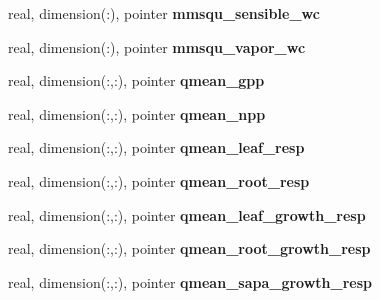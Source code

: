 \begin{DoxyCompactItemize}
\item 
\hypertarget{structed__state__vars_1_1patchtype_a44fbdd74f353ead65b3e826ad82fc1e7}{
real, dimension(:), pointer {\bfseries mmsqu\_\-sensible\_\-wc}}
\label{structed__state__vars_1_1patchtype_a44fbdd74f353ead65b3e826ad82fc1e7}

\item 
\hypertarget{structed__state__vars_1_1patchtype_a7b4691bbc3e40181dce7f83e270026c5}{
real, dimension(:), pointer {\bfseries mmsqu\_\-vapor\_\-wc}}
\label{structed__state__vars_1_1patchtype_a7b4691bbc3e40181dce7f83e270026c5}

\item 
\hypertarget{structed__state__vars_1_1patchtype_a8510cec7ca4e820044e79ff1ed068f52}{
real, dimension(:,:), pointer {\bfseries qmean\_\-gpp}}
\label{structed__state__vars_1_1patchtype_a8510cec7ca4e820044e79ff1ed068f52}

\item 
\hypertarget{structed__state__vars_1_1patchtype_a5ac42b8beb673e030d9e4cfae750656e}{
real, dimension(:,:), pointer {\bfseries qmean\_\-npp}}
\label{structed__state__vars_1_1patchtype_a5ac42b8beb673e030d9e4cfae750656e}

\item 
\hypertarget{structed__state__vars_1_1patchtype_afb6555595b15dec523eac228851440b9}{
real, dimension(:,:), pointer {\bfseries qmean\_\-leaf\_\-resp}}
\label{structed__state__vars_1_1patchtype_afb6555595b15dec523eac228851440b9}

\item 
\hypertarget{structed__state__vars_1_1patchtype_ae7fdb41a932f23c6788d3652633618f2}{
real, dimension(:,:), pointer {\bfseries qmean\_\-root\_\-resp}}
\label{structed__state__vars_1_1patchtype_ae7fdb41a932f23c6788d3652633618f2}

\item 
\hypertarget{structed__state__vars_1_1patchtype_a8a0ab7d999d151c18e05ba3d85e93edf}{
real, dimension(:,:), pointer {\bfseries qmean\_\-leaf\_\-growth\_\-resp}}
\label{structed__state__vars_1_1patchtype_a8a0ab7d999d151c18e05ba3d85e93edf}

\item 
\hypertarget{structed__state__vars_1_1patchtype_af2c16c4aa90bafb0de93e9414f7b2ae6}{
real, dimension(:,:), pointer {\bfseries qmean\_\-root\_\-growth\_\-resp}}
\label{structed__state__vars_1_1patchtype_af2c16c4aa90bafb0de93e9414f7b2ae6}

\item 
\hypertarget{structed__state__vars_1_1patchtype_a6eae471b732e41b0e386bb73ef43b85d}{
real, dimension(:,:), pointer {\bfseries qmean\_\-sapa\_\-growth\_\-resp}}
\label{structed__state__vars_1_1patchtype_a6eae471b732e41b0e386bb73ef43b85d}


\end{DoxyCompactItemize}
